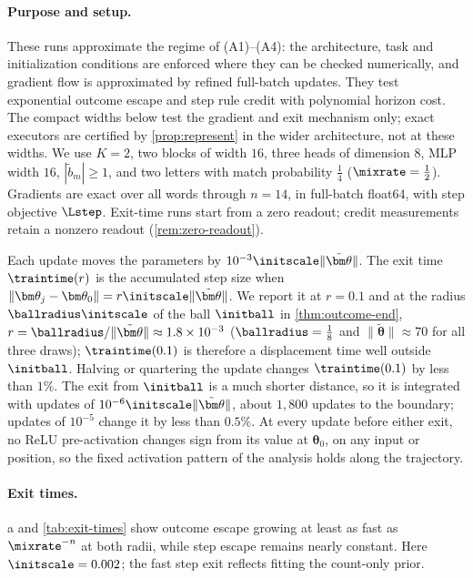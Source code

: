 \paragraph{Purpose and setup.} These runs approximate the regime of (A1)--(A4): the architecture, task and initialization conditions are enforced where
they can be checked numerically, and gradient flow is approximated by refined full-batch updates. They test exponential outcome
escape and step rule credit with polynomial horizon cost. The compact widths below test the gradient and exit mechanism only;
exact executors are certified by \cref{prop:represent} in the wider architecture, not at these widths.
We use $K=2$, two blocks of width $16$, three heads of dimension $8$, MLP width $16$, $|\tilde b_m|\ge1$,
and two letters with match probability $\tfrac{1}{4}$ ($\mixrate=\tfrac{1}{2}$). Gradients are exact over all words through $n=14$,
in full-batch float64, with step objective $\Lstep$. Exit-time runs start from a zero readout; credit measurements retain a
nonzero readout (\cref{rem:zero-readout}).

Each update moves the parameters by $10^{-3}\initscale\|\tilde{\bm\theta}\|$.
The exit time $\traintime(r)$ is the accumulated step size when $\|\bm\theta_j-\bm\theta_0\|=r\initscale\|\tilde{\bm\theta}\|$. We report it at
$r=0.1$ and at the radius $\ballradius\initscale$ of the ball $\initball$ in \cref{thm:outcome-end}, $r=\ballradius/\|\tilde{\bm\theta}\|\approx1.8\times10^{-3}$
($\ballradius=\tfrac{1}{8}$ and $\|\tilde{\bm\theta}\|\approx70$ for all three draws); $\traintime(0.1)$ is therefore a displacement time well outside $\initball$.
Halving or quartering the update changes $\traintime(0.1)$ by less than $1\%$. The exit from $\initball$ is a much shorter distance, so
it is integrated with updates of $10^{-6}\initscale\|\tilde{\bm\theta}\|$, about $1{,}800$ updates to the boundary; updates of $10^{-5}$ change it by
less than $0.5\%$. At every update before either exit, no ReLU pre-activation
changes sign from its value at $\bm\theta_0$, on any input or position, so the fixed activation pattern of the analysis holds along the trajectory.

\paragraph{Exit times.} a and \cref{tab:exit-times} show outcome escape growing at least as fast as
$\mixrate^{-n}$ at both radii, while step escape remains nearly constant. Here $\initscale=0.002$; the fast step exit reflects fitting the
count-only prior.


